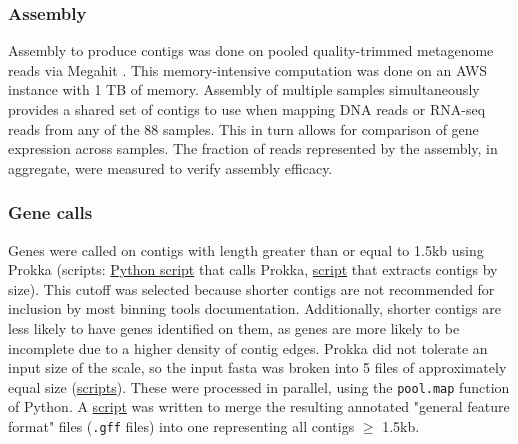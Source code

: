 \subsubsection{Assembly} %
Assembly to produce contigs was done on pooled quality-trimmed metagenome reads via Megahit \cite{li2015}.
This memory-intensive computation was done on an AWS instance with 1 TB of memory.
Assembly of multiple samples simultaneously provides a shared set of contigs to use when mapping DNA reads or RNA-seq reads from any of the 88 samples.  %
This in turn allows for comparison of gene expression across samples.
The fraction of reads represented by the assembly, in aggregate, were measured to verify assembly efficacy.

\subsubsection{Gene calls}
Genes were called on contigs with length greater than or equal to 1.5kb using Prokka \cite{seemann2014} (scripts: \href{https://github.com/BeckResearchLab/meta4/blob/master/m4b_binning/assembly/prokka/prokka.py}{Python script} that calls Prokka, \href{https://github.com/BeckResearchLab/meta4/blob/master/m4b_binning/assembly/contigs_by_length/select_contigs_by_size.py}{script} that extracts contigs by size).
This cutoff was selected because shorter contigs are not recommended for inclusion by most binning tools documentation.
Additionally, shorter contigs are less likely to have genes identified on them, as genes are more likely to be incomplete due to a higher density of contig edges.
Prokka did not tolerate an input size of the scale, so the input fasta was broken into 5 files of approximately equal size (\href{https://github.com/BeckResearchLab/meta4/tree/master/m4b_binning/assembly/prokka/contigs}{scripts}).
These were processed in parallel, using the \texttt{pool.map} function of Python.
A \href{https://github.com/BeckResearchLab/meta4/blob/master/m4b_binning/assembly/prokka/contigs/glue_together_gffs.py}{script} was written to merge the resulting annotated "general feature format" files (\texttt{.gff} files) into one representing all contigs $\geq$ 1.5kb.


